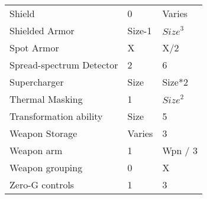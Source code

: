 \documentclass[twoside]{book}
\begin{document}
\begin{longtable}{p{1.25in}ll}
      \raggedright  Shield& 0& Varies\tabularnewline
      \raggedright  Shielded Armor& Size-1& \begin{math}{Size}^{3}\end{math}\tabularnewline
      \raggedright  Spot Armor& X& X/2\tabularnewline
      \raggedright  Spread-spectrum Detector& 2& 6\tabularnewline
      \raggedright  Supercharger& Size& Size*2\tabularnewline
      \raggedright  Thermal Masking& 1& \begin{math}{Size}^{2}\end{math}\tabularnewline
      \raggedright  Transformation ability& Size& 5\tabularnewline
      \raggedright  Weapon Storage& Varies& 3\tabularnewline
      \raggedright  Weapon arm& 1& Wpn / 3\tabularnewline
      \raggedright  Weapon grouping& 0& X\tabularnewline
      \raggedright  Zero-G controls& 1& 3\tabularnewline
      
\end{longtable}
    
\end{document}
